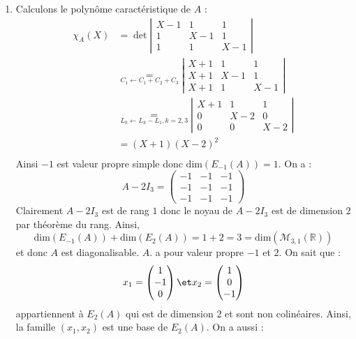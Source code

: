 \documentclass[a4paper,10pt]{report}
\begin{document}
\corr 
\begin{enumerate}
\item Calculons le polynôme caractéristique de $A$ :
\begin{align*}
\chi_A(X) & =\det \left\vert  \begin{array}{*{20}{c}}
{X - 1}&1&1\\
1&{X - 1}&1\\
1&1&{X - 1}
\end{array}  \right\vert \\
&  \underset{{C_1} \leftarrow {C_1} + {C_2} + {C_3}}{=} \left\vert \begin{array}{*{20}{c}}
{X + 1}&1&1\\
{X + 1}&{X - 1}&1\\
{X + 1}&1&{X - 1} 
\end{array} \right\vert  \\
&  \underset{{L_k} \leftarrow {L_k} - {L_1}, k=2,3}{=}  \left\vert \begin{array}{*{20}{c}}
{X + 1}&1&1\\
0&{X - 2}&0\\
0&0&{X - 2}
\end{array} \right\vert \\
& = \left( {X + 1} \right){\left( {X - 2} \right)^2} \\
\end{align*}
Ainsi $-1$ est valeur propre simple donc $\textrm{dim}(E_{-1}(A))=1$. On a :
$$ A-2I_3 = \left(\begin{array}{ccc}
-1 & -1 & -1\\
-1 & -1 & -1\\
-1 & -1 & -1
\end{array}\right)$$
Clairement $A-2I_3$ est de rang $1$ donc le noyau de $A-2I_3$ est de dimension $2$ par théorème du rang. Ainsi,
$$ \textrm{dim}(E_{-1}(A)) + \textrm{dim}(E_2(A)) = 1+2 = 3 = \textrm{dim}(\mathcal{M}_{3,1}(\mathbb{R}))$$
et donc $A$ est diagonalisable. $A$. a pour valeur propre $-1$ et $2$. On sait que :
$$ x_1= \begin{pmatrix}
1 \\
 -1 \\ 0 
\end{pmatrix} \et x_2=\begin{pmatrix}
1 \\
0 \\
-1
\end{pmatrix}$$
appartiennent à $E_2(A)$ qui est de dimension $2$ et sont non colinéaires. Ainsi, la famille $(x_1,x_2)$ est une base de $E_2(A)$. On a aussi :

\end{enumerate}
\end{document}
